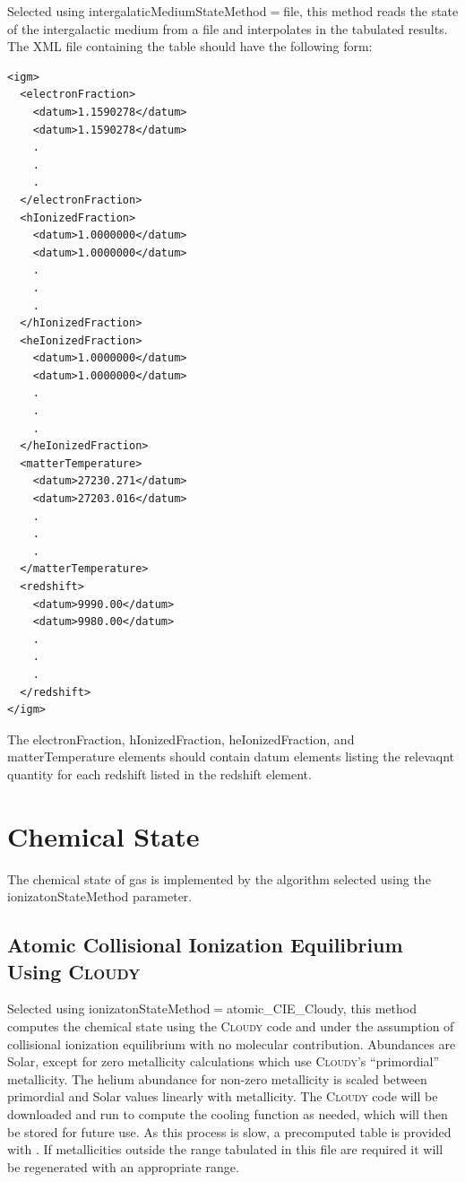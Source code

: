 Selected using {\normalfont \ttfamily intergalaticMediumStateMethod}$=${\normalfont \ttfamily file}, this method reads the state of the intergalactic medium from a file and interpolates in the tabulated results. The XML file containing the table should have the following form:
 \begin{verbatim}
<igm>
  <electronFraction>
    <datum>1.1590278</datum>
    <datum>1.1590278</datum>
    .
    .
    .
  </electronFraction>
  <hIonizedFraction>
    <datum>1.0000000</datum>
    <datum>1.0000000</datum>
    .
    .
    .
  </hIonizedFraction>
  <heIonizedFraction>
    <datum>1.0000000</datum>
    <datum>1.0000000</datum>
    .
    .
    .
  </heIonizedFraction>
  <matterTemperature>
    <datum>27230.271</datum>
    <datum>27203.016</datum>
    .
    .
    .
  </matterTemperature>
  <redshift>
    <datum>9990.00</datum>
    <datum>9980.00</datum>
    .
    .
    .
  </redshift>
</igm>
 \end{verbatim}
 The {\normalfont \ttfamily electronFraction}, {\normalfont \ttfamily hIonizedFraction}, {\normalfont \ttfamily heIonizedFraction}, and {\normalfont \ttfamily matterTemperature} elements should contain {\normalfont \ttfamily datum} elements listing the relevaqnt quantity for each redshift listed in the {\normalfont \ttfamily redshift} element.

\section{Chemical State}\label{sec:ChemicalStateMethod}

The chemical state of gas is implemented by the algorithm selected using the {\normalfont \ttfamily ionizatonStateMethod} parameter.

\subsection{Atomic Collisional Ionization Equilibrium Using {\normalfont \scshape Cloudy}}

Selected using {\normalfont \ttfamily ionizatonStateMethod}$=${\normalfont \ttfamily atomic\_CIE\_Cloudy}, this method computes the chemical state using the {\normalfont \scshape Cloudy} code and under the assumption of collisional ionization equilibrium with no molecular contribution. Abundances are Solar, except for zero metallicity calculations which use {\normalfont \scshape Cloudy}'s ``primordial'' metallicity. The helium abundance for non-zero metallicity is scaled between primordial and Solar values linearly with metallicity. The {\normalfont \scshape Cloudy} code will be downloaded and run to compute the cooling function as needed, which will then be stored for future use. As this process is slow, a precomputed table is provided with \glc. If metallicities outside the range tabulated in this file are required it will be regenerated with an appropriate range.

